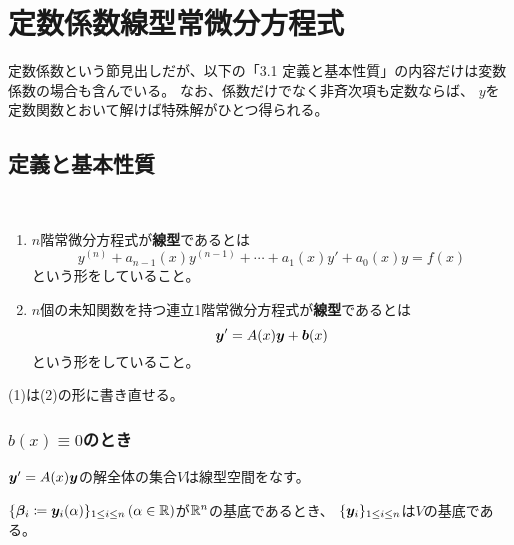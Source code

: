\documentclass[report]{jlreq}
\begin{document}
\chapter{定数係数線型常微分方程式}

定数係数という節見出しだが、以下の「3.1 定義と基本性質」の内容だけは変数係数の場合も含んでいる。
なお、係数だけでなく非斉次項も定数ならば、
$y$を定数関数とおいて解けば特殊解がひとつ得られる。

\section{定義と基本性質}

\begin{definition}[3.1.1 線型]
    \,
    \begin{enumerate}
        \item $n$階常微分方程式が\textbf{線型}であるとは
            \begin{equation}
                y^{(n)} + a_{n-1}(x) y^{(n-1)} + \cdots + a_1(x) y' + a_0(x) y = f(x)
            \end{equation}
            という形をしていること。
        \item $n$個の未知関数を持つ連立1階常微分方程式が\textbf{線型}であるとは
            \begin{equation}
                \bm{y}' = A(x) \bm{y} + \bm{b}(x)
            \end{equation}
            という形をしていること。
    \end{enumerate}
\end{definition}

(1)は(2)の形に書き直せる。

\subsection{$b(x) \equiv 0$のとき}
$\bm{y}' = A(x) \bm{y}$の解全体の集合$V$は線型空間をなす。

\begin{theorem}[3.1.2]
    $\{ \bm{\beta}_i \coloneqq \bm{y}_i(\alpha) \}_{1 \le i \le n}\, (\alpha \in \mathbb{R})$が$\mathbb{R}^n$の基底であるとき、
    $\{ \bm{y}_i \}_{1 \le i \le n}$は$V$の基底である。
\end{theorem}
\end{document}
